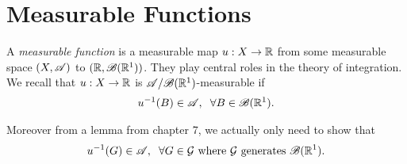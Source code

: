 

\section{Measurable Functions}

A \textit{measurable function} is a measurable map $u:X\rightarrow  \mathbb{R}$ from some measurable space $(X,\mathscr{A})$
 to $(\mathbb{R},\mathscr B(\mathbb R^{1}))$.
They play central roles in the theory of integration. \\

We recall that $u:X\rightarrow \mathbb{R} $ is $\mathscr{A}/\mathscr B(\mathbb R^{1})$-measurable if \begin{align}
    u^{-1}(B)\in\mathscr{A},\hspace{2mm}\forall B\in \mathscr B(\mathbb R^{1}).
\end{align}

Moreover from a lemma from chapter 7, we actually only need to show that \begin{align}
    u^{-1}(G)\in\mathscr{A},\hspace{2mm} \forall G\in\mathcal G \text{ where } \mathcal G \text{ generates } \mathscr B(\mathbb R^{1}).
\end{align} 



